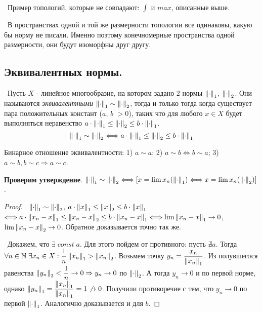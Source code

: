 \smallskip
\noindent \textbullet~Пример топологий, которые не совпадают: $\int$ и $max$, описанные выше.

\smallskip
\noindent \textbullet~В пространствах одной и той же размерности топологии все одинаковы, какую бы норму не писали. Именно поэтому конечномерные пространства одной 
размерности, они будут изоморфны друг другу.

\subsection*{Эквивалентных нормы.}
\noindent \textasteriskcentered~Пусть $X$ - линейное многообразие, на котором задано 2 нормы $\left\lVert\cdot\right\rVert_1$, $\left\lVert\cdot\right\rVert_2$. Они называются \textit{ эквивалентными} $\left\lVert\cdot\right\rVert_1 \sim \left\lVert\cdot\right\rVert_2$, 
тогда и только тогда когда существует пара положительных констант ($a$, $b$ $> 0$), таких что для любого $x \in X$ будет выполняться неравенство $a \cdot \left\lVert\cdot\right\rVert_1 \le 
\left\lVert\cdot\right\rVert_2 \le b \cdot \left\lVert\cdot\right\rVert_1$.
\[
    \left\lVert\cdot\right\rVert_1 \sim \left\lVert\cdot\right\rVert_2 \Longleftrightarrow a \cdot \left\lVert\cdot\right\rVert_1 \le \left\lVert\cdot\right\rVert_2 \le b \cdot \left\lVert\cdot\right\rVert_1
\]

\medskip
\noindent Бинарное отношение эквивалентности:
1) $a \sim a$;
2) $a \sim b \Longleftrightarrow b \sim a$;
3) $a \sim b, b \sim c \Rightarrow a \sim c$.

\bigskip 
\noindent \textbf{Проверим утверждение}. $\left\lVert\cdot\right\rVert_1 \sim \left\lVert\cdot\right\rVert_2 \Longleftrightarrow [x = \lim x_n (\left\lVert\cdot\right\rVert_1) \Longleftrightarrow x = \lim x_n (\left\lVert\cdot\right\rVert_2)]$.

\begin{proof}

\noindent \textbullet~$\left\lVert\cdot\right\rVert_1 \sim \left\lVert\cdot\right\rVert_2$, $a \cdot \left\lVert x\right\rVert_1 \le \left\lVert x\right\rVert_2 \le b \cdot \left\lVert x\right\rVert_1$ $\Longleftrightarrow 
a \cdot \left\lVert x_n - x\right\rVert_1 \le \left\lVert x_n - x\right\rVert_2 \le b \cdot \left\lVert x_n - x\right\rVert_1 \Longleftrightarrow
\lim \left\lVert x_n - x\right\rVert_1 \to 0$, $\lim \left\lVert x_n - x\right\rVert_2 \to 0$. Обратное доказывается точно так же.

\smallskip 
\noindent \textbullet~Докажем, что $\exists \; const \; a$. Для этого пойдем от противного: пусть $\nexists a $. Тогда $\forall n \in \mathbb{N} \; \exists x_n \in X : \dfrac{1}
{n} \left\lVert x_n\right\rVert_1 > \left\lVert x_n\right\rVert_2$. Возьмем точку $y_n = \dfrac{x_n}{\left\lVert x_n\right\rVert_1}$. Из полувшегося равенства $\left\lVert y_n\right\rVert_2 < \dfrac{1}{n} \to 0 \Rightarrow y_n \to 0$ 
по $\left\lVert\cdot\right\rVert_2$. А тогда $y_n \to 0$ и по первой норме, однако $\left\lVert y_n\right\rVert_1 = \dfrac{\left\lVert x_n\right\rVert_1}{\left\lVert x_n\right\rVert_1} = 1 \not\to 0$. Получили противоречие с тем, что 
$y_n \to 0$ по первой $\left\lVert\cdot\right\rVert_1$. Аналогично доказывается и для  $b$.
\end{proof}
